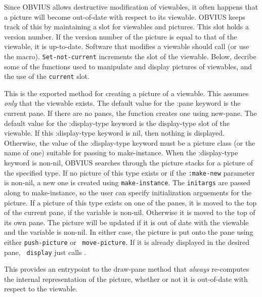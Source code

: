 Since OBVIUS allows destructive modification of viewables, it often
happens that a picture will become out-of-date with respect to its
viewable.  OBVIUS keeps track of this by maintaining a 
slot for viewables and pictures.  This slot holds a version number.
If the version number of the picture is equal to that of the viewable,
it is up-to-date.  Software that modifies a viewable should call
 (or use the  macro). 
{\tt Set-not-current} increments the  slot of the
viewable.  Below, decribe some of the
functions used to manipulate and display pictures of viewables, and
the use of the {\tt current} slot.
\begin{description}

\item{}
This is the exported method for creating a picture of a viewable.
This assumes {\em only} that the viewable exists.  The default value
for the :pane keyword is the current pane.  If there are no panes, the
function creates one using new-pane.  The default value for the
:display-type keyword is the display-type slot of the viewable.  If
this :display-type keyword is nil, then nothing is displayed.
Otherwise, the value of the :display-type keyword must be a picture
class (or the name of one) suitable for passing to make-instance.
When the :display-type keyword is non-nil, OBVIUS searches through the
picture stacks for a picture of the specified type.  If no picture of
this type exists or if the {\tt :make-new} parameter is non-nil, a new
one is created using {\tt make-instance}.  The {\tt initargs} are
passed along to make-instance, so the user can specify initialization
arguements for the picture.  If a picture of this type exists on one
of the panes, it is moved to the top of the current pane, if the
variable  is non-nil.  Otherwise it is
moved to the top of its own pane.  The picture will be updated if it
is out of date with the viewable and the variable
 is non-nil.  In either case, the picture
is put onto the pane using either {\tt push-picture} or {\tt
move-picture}.  If it is already displayed in the desired pane, {\tt
display} just calls .

\item{}
This provides an entrypoint to the draw-pane method that {\em always}
re-computes the internal representation of the picture, whether or not
it is out-of-date with respect to the viewable.


\end{description}
